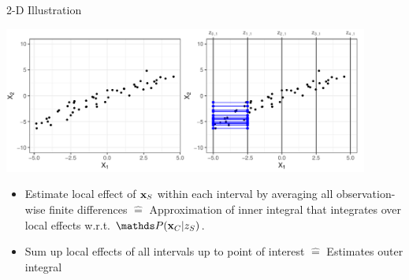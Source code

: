 \documentclass[11pt,compress,t,notes=noshow, aspectratio=169, xcolor=table]{beamer}
\begin{document}
\begin{frame}{2-D Illustration}
\centerline{\includegraphics[width=0.9\textwidth]{figure/ale_interval}}

 \begin{itemize}
  \item Estimate local effect of $\xv_S$ within each interval by averaging all observation-wise finite differences $\hat = $ Approximation of inner integral that integrates over local effects w.r.t. $\P(\xv_C | z_S)$. %
  \item Sum up local effects of all intervals up to point of interest $\hat = $ Estimates outer integral
\end{itemize}

\end{frame}
%
%
%
%
%
%
%
%
%
%
\end{document}
